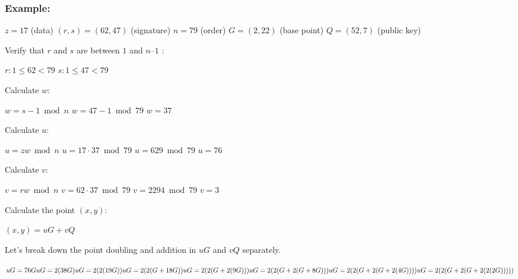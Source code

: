 \documentclass{article}
\begin{document}
\subsubsection*{Example:}\par\noindent
\begin{adjustwidth}{2.5em}{0pt}
    \(z = 17\) (data)\newline
    \((r, s) = (62, 47)\) (signature)\newline
    \(n = 79\) (order)\newline
    \(G = (2, 22)\) (base point)\newline
    \(Q = (52, 7)\) (public key)
\end{adjustwidth}
Verify that \(r\) and \(s\) are between \(1\) and \(n – 1\) : 
\begin{adjustwidth}{2.5em}{0pt}
    \(r: 1 \leq 62 < 79\)\newline
    \(s: 1 \leq 47 < 79\)
\end{adjustwidth}
Calculate \(w\):
\begin{adjustwidth}{2.5em}{0pt}
    \(w = s - 1 \bmod n\)\newline
    \(w = 47 - 1 \bmod 79\)\newline
    \(w = 37\)
\end{adjustwidth}
Calculate \(u\):
\begin{adjustwidth}{2.5em}{0pt}
    \(u = zw \bmod n\)\newline
    \(u = 17 \cdot 37 \bmod 79\)\newline
    \(u = 629 \bmod 79\)\newline
    \(u = 76\)
\end{adjustwidth}
Calculate \(v\):
\begin{adjustwidth}{2.5em}{0pt}
    \(v = rw \bmod n\)\newline
    \(v = 62 \cdot 37 \bmod 79\)\newline
    \(v = 2294 \bmod 79 \)\newline
    \(v=3\)
\end{adjustwidth}
Calculate the point \((x, y)\):
\begin{adjustwidth}{2.5em}{0pt}
    \((x, y) = uG + vQ\)
\end{adjustwidth}
Let’s break down the point doubling and addition in \(uG\) and \(vQ\) separately.
\begin{adjustwidth}{2.5em}{0pt}
    \(uG = 76G \newline
    uG = 2(38G) \newline
    uG = 2( 2(19G) ) \newline
    uG = 2( 2(G + 18G) ) \newline
    uG = 2( 2(G + 2(9G) ) ) \newline
    uG = 2( 2(G + 2(G + 8G) ) ) \newline
    uG = 2( 2(G + 2(G + 2(4G) ) ) ) \newline
    uG = 2( 2(G + 2(G + 2( 2(2G) ) ) ) ) \)
\end{adjustwidth}
\end{document}
